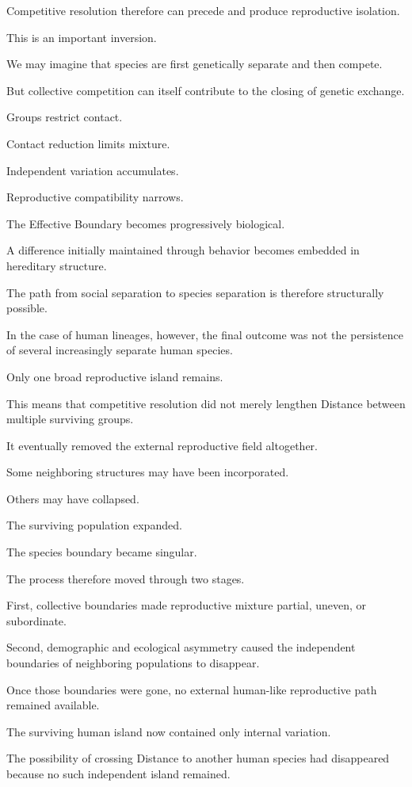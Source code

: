 Competitive resolution therefore can precede and produce reproductive isolation.

This is an important inversion.

We may imagine that species are first genetically separate and then compete.

But collective competition can itself contribute to the closing of genetic exchange.

Groups restrict contact.

Contact reduction limits mixture.

Independent variation accumulates.

Reproductive compatibility narrows.

The Effective Boundary becomes progressively biological.

A difference initially maintained through behavior becomes embedded in hereditary structure.

The path from social separation to species separation is therefore structurally possible.

In the case of human lineages, however, the final outcome was not the persistence of several increasingly separate human species.

Only one broad reproductive island remains.

This means that competitive resolution did not merely lengthen Distance between multiple surviving groups.

It eventually removed the external reproductive field altogether.

Some neighboring structures may have been incorporated.

Others may have collapsed.

The surviving population expanded.

The species boundary became singular.

The process therefore moved through two stages.

First, collective boundaries made reproductive mixture partial, uneven, or subordinate.

Second, demographic and ecological asymmetry caused the independent boundaries of neighboring populations to disappear.

Once those boundaries were gone, no external human-like reproductive path remained available.

The surviving human island now contained only internal variation.

The possibility of crossing Distance to another human species had disappeared because no such independent island remained.

